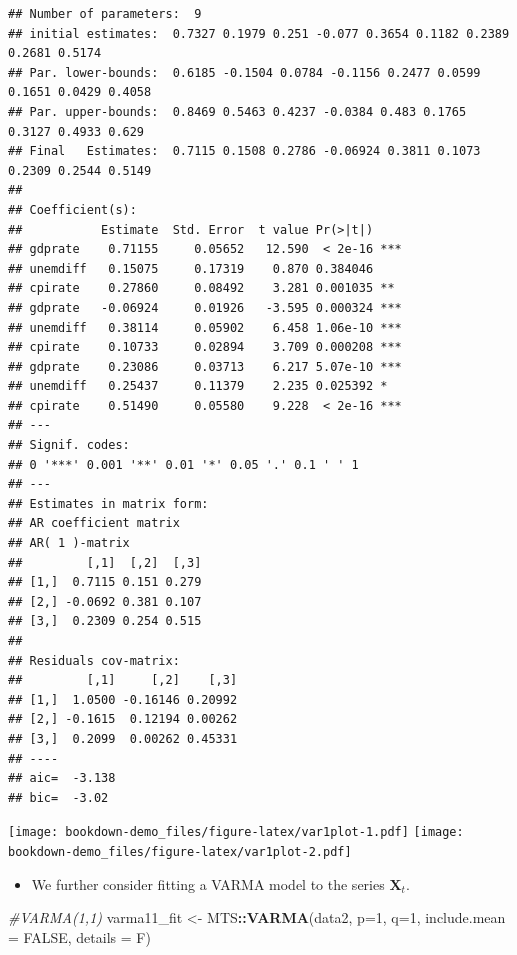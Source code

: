 \documentclass[]{book}
\newenvironment{Shaded}{\begin{snugshade}}{\end{snugshade}}
\newcommand{\CommentTok}[1]{\textcolor[rgb]{0.56,0.35,0.01}{\textit{#1}}}
\newcommand{\DataTypeTok}[1]{\textcolor[rgb]{0.13,0.29,0.53}{#1}}
\newcommand{\DecValTok}[1]{\textcolor[rgb]{0.00,0.00,0.81}{#1}}
\newcommand{\KeywordTok}[1]{\textcolor[rgb]{0.13,0.29,0.53}{\textbf{#1}}}
\newcommand{\NormalTok}[1]{#1}
\newcommand{\OperatorTok}[1]{\textcolor[rgb]{0.81,0.36,0.00}{\textbf{#1}}}
\newcommand{\OtherTok}[1]{\textcolor[rgb]{0.56,0.35,0.01}{#1}}
\newcommand{\StringTok}[1]{\textcolor[rgb]{0.31,0.60,0.02}{#1}}
\providecommand{\tightlist}{%
  \setlength{\itemsep}{0pt}\setlength{\parskip}{0pt}}
\begin{document}
\begin{verbatim}
## Number of parameters:  9 
## initial estimates:  0.7327 0.1979 0.251 -0.077 0.3654 0.1182 0.2389 0.2681 0.5174 
## Par. lower-bounds:  0.6185 -0.1504 0.0784 -0.1156 0.2477 0.0599 0.1651 0.0429 0.4058 
## Par. upper-bounds:  0.8469 0.5463 0.4237 -0.0384 0.483 0.1765 0.3127 0.4933 0.629 
## Final   Estimates:  0.7115 0.1508 0.2786 -0.06924 0.3811 0.1073 0.2309 0.2544 0.5149 
## 
## Coefficient(s):
##           Estimate  Std. Error  t value Pr(>|t|)    
## gdprate    0.71155     0.05652   12.590  < 2e-16 ***
## unemdiff   0.15075     0.17319    0.870 0.384046    
## cpirate    0.27860     0.08492    3.281 0.001035 ** 
## gdprate   -0.06924     0.01926   -3.595 0.000324 ***
## unemdiff   0.38114     0.05902    6.458 1.06e-10 ***
## cpirate    0.10733     0.02894    3.709 0.000208 ***
## gdprate    0.23086     0.03713    6.217 5.07e-10 ***
## unemdiff   0.25437     0.11379    2.235 0.025392 *  
## cpirate    0.51490     0.05580    9.228  < 2e-16 ***
## ---
## Signif. codes:  
## 0 '***' 0.001 '**' 0.01 '*' 0.05 '.' 0.1 ' ' 1
## --- 
## Estimates in matrix form: 
## AR coefficient matrix 
## AR( 1 )-matrix 
##         [,1]  [,2]  [,3]
## [1,]  0.7115 0.151 0.279
## [2,] -0.0692 0.381 0.107
## [3,]  0.2309 0.254 0.515
##   
## Residuals cov-matrix: 
##         [,1]     [,2]    [,3]
## [1,]  1.0500 -0.16146 0.20992
## [2,] -0.1615  0.12194 0.00262
## [3,]  0.2099  0.00262 0.45331
## ---- 
## aic=  -3.138 
## bic=  -3.02
\end{verbatim}

\begin{Shaded}
\end{Shaded}

\texttt{[image: bookdown-demo\_files/figure-latex/var1plot-1.pdf]} \texttt{[image: bookdown-demo\_files/figure-latex/var1plot-2.pdf]}

\begin{itemize}
\tightlist
\item
  We further consider fitting a VARMA model to the series \(\mathbf{X}_t\).
\end{itemize}

\begin{Shaded}
\begin{Highlighting}[]
\CommentTok{#VARMA(1,1)}
\NormalTok{varma11_fit <-}\StringTok{ }\NormalTok{MTS}\OperatorTok{::}\KeywordTok{VARMA}\NormalTok{(data2, }\DataTypeTok{p=}\DecValTok{1}\NormalTok{, }\DataTypeTok{q=}\DecValTok{1}\NormalTok{, }\DataTypeTok{include.mean =} \OtherTok{FALSE}\NormalTok{, }\DataTypeTok{details =}\NormalTok{ F)}
\end{Highlighting}
\end{Shaded}
\end{document}
